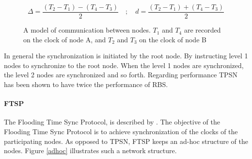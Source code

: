 \documentclass[a4paper,12pt]{article}
\begin{document}
    $$\Delta = \frac{(T_2-T_1) - (T_4 - T_3)}{2} \quad ; \quad d = \frac{(T_2-T_1) + (T_4-T_3)}{2}$$
    
    \begin{figure}
        \centering
         \caption{A model of communication between nodes. $T_1$ and $T_4$ are recorded on the clock of node A, and $T_2$ and $T_3$ on the clock of node B}
        \label{timemeasuretpsn}
    \end{figure}
    
    In general the synchronization is initiated by the root node. By instructing level 1 nodes to synchronize to the root node. When the level 1 nodes are synchronized, the level 2 nodes are synchronized and so forth. Regarding performance TPSN has been shown to have twice the performance of RBS.
    
    
    \paragraph{FTSP} %
    The Flooding Time Sync Protocol, is described by \citet{Maroti04}. The objective of the Flooding Time Sync Protocol is to achieve synchronization of the clocks of the participating nodes. As opposed to TPSN, FTSP keeps an ad-hoc structure of the nodes. Figure \ref{adhoc} illustrates such a network structure.
    
\end{document}
